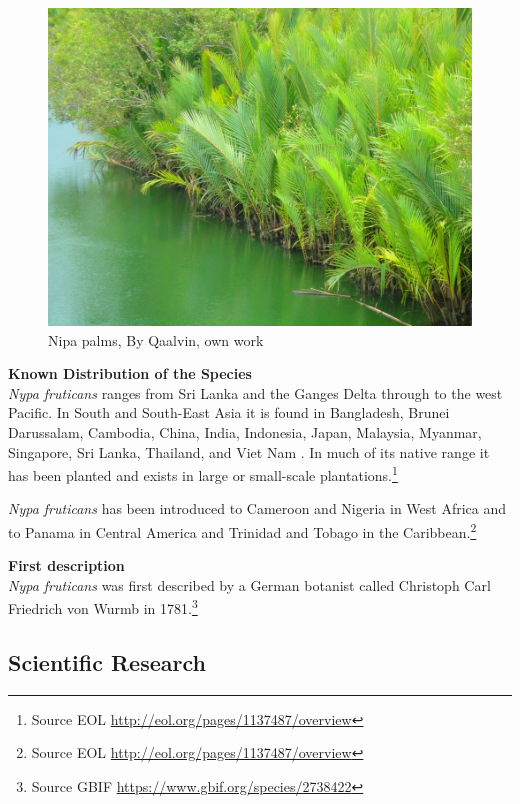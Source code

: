 \documentclass[]{book}
\theoremstyle{definition}
\theoremstyle{definition}
\theoremstyle{definition}
\theoremstyle{remark}
\begin{document}
\begin{figure}

{\centering \includegraphics[width=13.33in]{images_species/Nipa_palms} 

}

\caption{Nipa palms, By Qaalvin, own work}\label{fig:unnamed-chunk-6}
\end{figure}

\textbf{Known Distribution of the Species}\\
\emph{Nypa fruticans} ranges from Sri Lanka and the Ganges Delta through
to the west Pacific. In South and South-East Asia it is found in
Bangladesh, Brunei Darussalam, Cambodia, China, India, Indonesia, Japan,
Malaysia, Myanmar, Singapore, Sri Lanka, Thailand, and Viet Nam . In
much of its native range it has been planted and exists in large or
small-scale plantations.\footnote{Source EOL
  \url{http://eol.org/pages/1137487/overview}}

\emph{Nypa fruticans} has been introduced to Cameroon and Nigeria in
West Africa and to Panama in Central America and Trinidad and Tobago in
the Caribbean.\footnote{Source EOL
  \url{http://eol.org/pages/1137487/overview}}

\textbf{First description}\\
\emph{Nypa fruticans} was first described by a German botanist called
Christoph Carl Friedrich von Wurmb in 1781.\footnote{Source GBIF
  \url{https://www.gbif.org/species/2738422}}

\hypertarget{scientific-research-4}{%
\subsection{Scientific Research}\label{scientific-research-4}}
\end{document}
